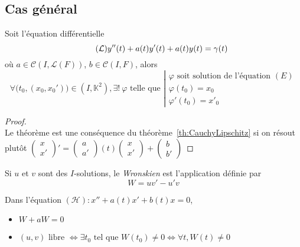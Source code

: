 \documentclass[11pt,a4paper,fleqn,pdftex]{report}
\begin{document}
\subsection{Cas général}
\begin{itheorem}
Soit l'équation différentielle 
\begin{equation}\tag{$\mathcal{L}$}
    y''(t) + a(t) y'(t) + a(t)y(t)= \gamma (t)
\end{equation}
où $a \in \mathcal{C}\left( I,\mathcal{L}(F)\right)$, $b\in \mathcal{C}(I,F)$, alors
\[
    \forall \big( t_0,(x_0,x_0') \big) \in (I,\mathbb{K}^2), \exists ! \: \varphi \text{ telle que }
    \left|
    \begin{array}{l}
        \varphi \text{ soit solution de l'équation }(E)\\
        \varphi(t_0)=x_0 \\
        \varphi'(t_0) = x'_0
    \end{array}
    \right.
\]
\end{itheorem}
\begin{proof} \hfill \\
    Le théorème est une conséquence du théorème~\ref{th:CauchyLipschitz} si on résout plutôt $\begin{pmatrix} x \\ x' \end{pmatrix}' = \begin{pmatrix} a \\ a' \end{pmatrix}(t)\begin{pmatrix} x \\ x' \end{pmatrix} + \begin{pmatrix} b \\ b' \end{pmatrix}$ 
\end{proof}
\begin{dfn}[Wronskien]
    Si $u$ et $v$ sont des $I$-solutions, le \emph{Wronskien} est l'application définie par
    \begin{equation}
    W = uv' - u'v \tag{Wronskien}
    \end{equation}
\end{dfn}
\begin{prop}
Dans l'équation $(\mathcal{H}) : x'' + a(t)x' + b(t) x =0$,
\begin{itemize}
    \item $W + a W = 0$
    \item $(u,v)\text{ libre }\Leftrightarrow \exists t_0 \text{ tel que } W(t_0) \neq 0 \Leftrightarrow \forall t, W(t) \neq 0$
\end{itemize}
\end{prop}
\end{document}
